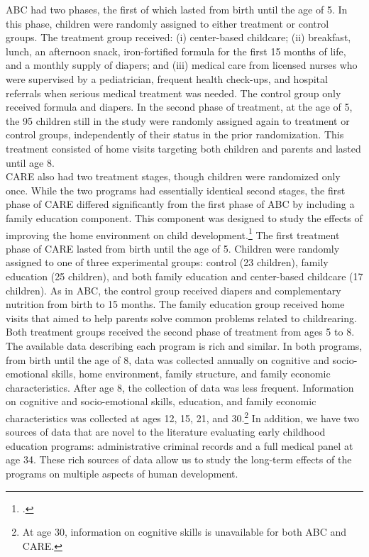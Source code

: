 \noindent ABC had two phases, the first of which lasted from birth until the age of 5. In this phase, children were randomly assigned to either treatment or control groups. The treatment group received: (i) center-based childcare; (ii) breakfast, lunch, an afternoon snack, iron-fortified formula for the first 15 months of life, and a monthly supply of diapers; and (iii) medical care from licensed nurses who were supervised by a pediatrician, frequent health check-ups, and hospital referrals when serious medical treatment was needed. The control group only received formula and diapers. In the second phase of treatment, at the age of 5, the 95 children still in the study were randomly assigned again to treatment or control groups, independently of their status in the prior randomization. This treatment consisted of home visits targeting both children and parents and lasted until age 8.\\ 

\noindent  CARE also had two treatment stages, though children were randomized only once. While the two programs had essentially identical second stages, the first phase of CARE differed significantly from the first phase of ABC by including a family education component. This component was designed to study the effects of improving the home environment on child development.\footnote{\citet{Wasik_Ramey_etal_1990_CD}.} The first treatment phase of CARE lasted from birth until the age of 5. Children were randomly assigned to one of three experimental groups: control (23 children), family education (25 children), and both family education and center-based childcare (17 children). As in ABC, the control group received diapers and complementary nutrition from birth to 15 months. The family education group received home visits that aimed to help parents solve common problems related to childrearing. Both treatment groups received the second phase of treatment from ages 5 to 8.\\

\noindent The available data describing each program is rich and similar. In both programs, from birth until the age of 8, data was collected annually on cognitive and socio-emotional skills, home environment, family structure, and family economic characteristics. After age 8, the collection of data was less frequent. Information on cognitive and socio-emotional skills, education, and family economic characteristics was collected at ages 12, 15, 21, and 30.\footnote{At age 30, information on cognitive skills is unavailable for both ABC and CARE.} In addition, we have two sources of data that are novel to the literature evaluating early childhood education programs: administrative criminal records and a full medical panel at age 34. These rich sources of data allow us to study the long-term effects of the programs on multiple aspects of human development.

